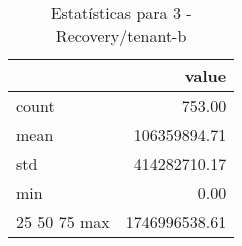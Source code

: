 \begin{table}[htbp]
\caption{Estatísticas para 3 - Recovery/tenant-b}
\label{tab:3_-_recovery_tenant-b_summary}
\begin{tabular}{lr}
\toprule
 & value \\
\midrule
count & 753.00 \\
mean & 106359894.71 \\
std & 414282710.17 \\
min & 0.00 \\
25%
50%
75%
max & 1746996538.61 \\
\bottomrule
\end{tabular}
\end{table}
